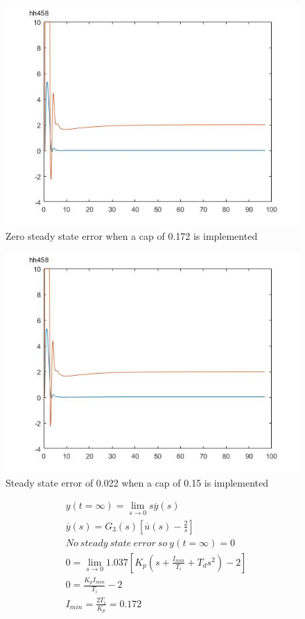 \documentclass[twoside,twocolumn]{article}
\begin{document}
\begin{figure}[h]
  \centering
    \includegraphics[width=\linewidth]{0-172}
  \caption{Zero steady state error when a cap of 0.172 is implemented}
  \label{fig:3-20-172}
\end{figure}

\begin{figure}[h]
  \centering
    \includegraphics[width=\linewidth]{0-15sse0-022}
  \caption{Steady state error of 0.022 when a cap of 0.15 is implemented}
  \label{fig:3-20-15}
\end{figure}

\begin{equation}
\label{eq:iwu}
\begin{split}
&y(t=\infty)=\lim_{s\to 0}s\overline{y}(s)\\
&\overline{y}(s)=G_3(s)[\overline{u}(s)-\frac{2}{s}]\\ 
&No \: steady \: state \: error \: so \: y(t=\infty)=0\\
&0=\lim_{s\to 0}1.037[K_p(s+\frac{I_{min}}{T_i}+T_ds^2) -2]\\
&0=\frac{K_pI_{min}}{T_i}-2\\
&I_{min} = \frac{2T_i}{K_p} = 0.172\\
\end{split}
\end{equation}
\end{document}
